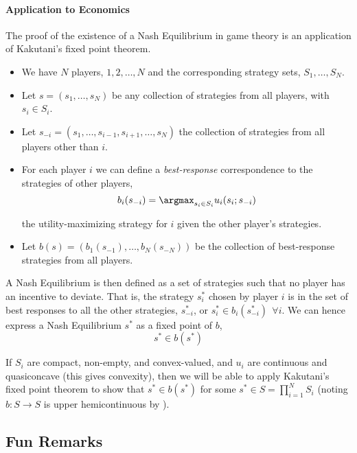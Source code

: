 \documentclass{article}
\begin{document}
\paragraph{Application to Economics}
\label{par:application_to_economics}

The proof of the existence of a Nash Equilibrium in game theory is an application of Kakutani's fixed point theorem.
\begin{itemize}[label=$\bullet$]
  \item We have $N$ players, $1, 2, \ldots, N$ and the corresponding strategy sets, $S_1, \ldots, S_N$.
  \item Let $s = (s_1, \ldots, s_N)$ be any collection of strategies from all players, with $s_i \in S_i$.
  \item Let $s_{-i} = (s_1, \ldots, s_{i - 1}, s_{i + 1}, \ldots, s_N)$ the collection of strategies from all players other than $i$.
  \item For each player $i$ we can define a \textit{best-response} correspondence to the strategies of other players,
    \[
      b_i(s_{-i}) = \argmax_{s_i \in S_i} u_i(s_i; s_{-i})
    \]

    the utility-maximizing strategy for $i$ given the other player's strategies.

  \item Let $b(s) = \left(b_1(s_{-1}), \ldots, b_N(s_{-N})\right)$ be the collection of best-response strategies from all players.
\end{itemize}

A Nash Equilibrium is then defined as a set of strategies such that no player has an incentive to deviate. That is, the strategy $s^*_i$ chosen by player $i$ is in the set of best responses to all the other strategies, $s^*_{-i}$, or $s^*_i \in b_i(s^*_{-i}) ~~ \forall i$. We can hence express a Nash Equilibrium $s^*$ as a fixed point of $b$,
\[
  s^* \in b(s^*)
\]

If $S_i$ are compact, non-empty, and convex-valued, and $u_i$ are continuous and quasiconcave (this gives convexity), then we will be able to apply Kakutani's fixed point theorem to show that $s^* \in b(s^*)$ for some $s^* \in S = \prod_{i = 1}^N S_i$ (noting $b: S \to S$ is upper hemicontinuous by ).

\subsection{Fun Remarks}
\label{sub:fun_remarks}
\end{document}
